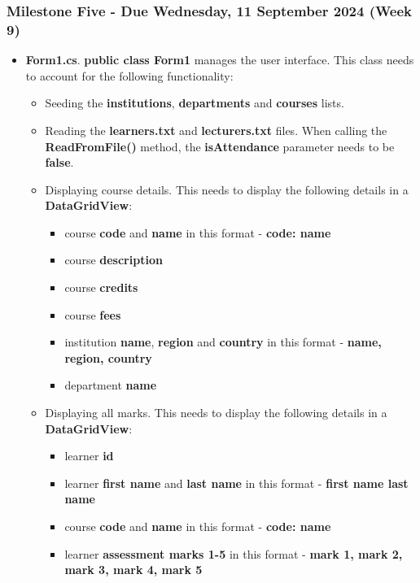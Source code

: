 \documentclass{article}
\begin{document}
\subsubsection*{Milestone Five - Due Wednesday, 11 September 2024 (Week 9)}

\begin{itemize}
    \item \textbf{Form1.cs}. \textbf{public class Form1} manages the user interface. This class needs to account for the following functionality:
    \begin{itemize}
        \item Seeding the \textbf{institutions}, \textbf{departments} and \textbf{courses} lists.
        \item Reading the \textbf{learners.txt} and \textbf{lecturers.txt} files. When calling the \textbf{ReadFromFile()} method, the \textbf{isAttendance} parameter needs to be \textbf{false}.
        \item Displaying course details. This needs to display the following details in a \textbf{DataGridView}:
        \begin{itemize}
            \item course \textbf{code} and \textbf{name} in this format - \textbf{code: name}
            \item course \textbf{description}
            \item course \textbf{credits}
            \item course \textbf{fees}
            \item institution \textbf{name}, \textbf{region} and \textbf{country} in this format - \textbf{name, region, country}
            \item department \textbf{name}
        \end{itemize}
        \item Displaying all marks. This needs to display the following details in a \textbf{DataGridView}:
        \begin{itemize}
            \item learner \textbf{id}
            \item learner \textbf{first name} and \textbf{last name} in this format - \textbf{first name last name}
            \item course \textbf{code} and \textbf{name} in this format - \textbf{code: name}
            \item learner \textbf{assessment marks 1-5} in this format - \textbf{mark 1, mark 2, mark 3, mark 4, mark 5}

\end{itemize}
\end{itemize}
\end{itemize}
\end{document}
